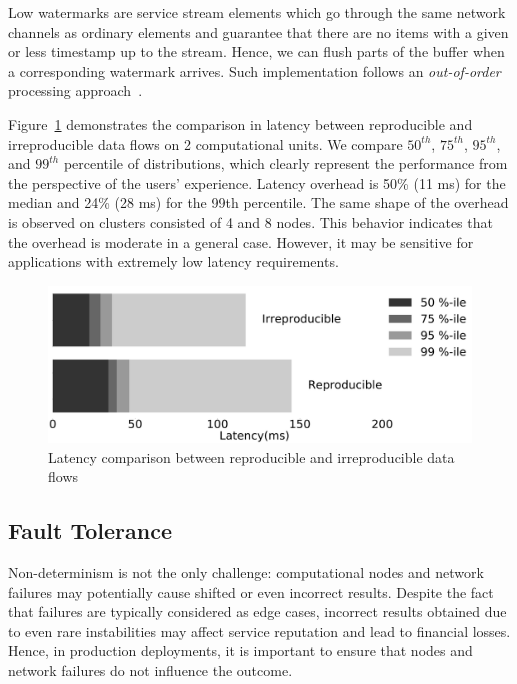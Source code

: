 Low watermarks are service stream elements which go through the same network channels as ordinary elements and guarantee that there are no items with a given or less timestamp up to the stream. Hence, we can flush parts of the buffer when a corresponding watermark arrives. Such implementation follows an {\em out-of-order} processing approach~\cite{Li:2008:OPN:1453856.1453890}.

Figure~\ref{reproducibility} demonstrates the comparison in latency between reproducible and irreproducible data flows on 2 computational units. We compare $50^{th}$, $75^{th}$, $95^{th}$, and $99^{th}$ percentile of distributions, which clearly represent the performance from the perspective of the users' experience. Latency overhead is 50\% (11 ms) for the median and 24\% (28 ms) for the 99th percentile. The same shape of the overhead is observed on clusters consisted of 4 and 8 nodes. This behavior indicates that the overhead is moderate in a general case. However, it may be sensitive for applications with extremely low latency requirements.

\begin{figure}[htbp]
  \centering
  \includegraphics[scale=0.09]{pics/reproducibility}
  \caption{Latency comparison between reproducible and irreproducible data flows}
  \label {reproducibility}
\end{figure}

\subsection{Fault Tolerance}

Non-determinism is not the only challenge: computational nodes and network failures may potentially cause shifted or even incorrect results. Despite the fact that failures are typically considered as edge cases, incorrect results obtained due to even rare instabilities may affect service reputation and lead to financial losses. Hence, in production deployments, it is important to ensure that nodes and network failures do not influence the outcome.

